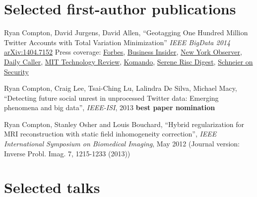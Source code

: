\documentclass[margin,line]{res}
\begin{document}
\begin{resume}
\section{\sc Selected first-author publications}

Ryan Compton, David Jurgens, David Allen, ``Geotagging One Hundred Million Twitter Accounts with Total Variation Minimization'' {\it IEEE BigData 2014} \href{https://arxiv.org/abs/1404.7152}{arXiv:1404.7152} Press coverage: \href{http://www.forbes.com/sites/thomasbrewster/2015/03/07/twitter-location-can-be-determined-through-friends/}{Forbes}, \href{http://www.businessinsider.com/twitter-location-research-at-mentions-cornell-2015-3}{Business Insider}, \href{http://observer.com/2015/03/you-dont-have-to-geotag-your-tweets-to-give-away-your-location/}{New York Observer}, \href{http://dailycaller.com/2015/03/06/how-your-tweets-can-reveal-your-real-location/}{Daily Caller}, \href{http://www.technologyreview.com/view/527246/other-interesting-arxiv-papers-week-ending-may-10-2014/}{MIT Technology Review}, \href{http://www.komando.com/happening-now/299085/forget-gps-hackers-can-pinpoint-your-exact-location-using-social-media/all}{Komando}, \href{http://ryancompton.net/assets/resume/Serene_Risc_Digest_2015_Spring.pdf}{Serene Risc Digest}, \href{http://www.schneier.com/blog/archives/2015/03/geotagging_twit.html}{Schneier on Security}

Ryan Compton, Craig Lee, Tsai-Ching Lu, Lalindra De Silva, Michael Macy, ``Detecting future social unrest in unprocessed Twitter data: Emerging phenomena and big data'', {\it IEEE-ISI}, 2013 {\bf best paper nomination}

Ryan Compton, Stanley Osher and Louis Bouchard, ``Hybrid regularization for MRI reconstruction with static field inhomogeneity correction'', {\it IEEE International Symposium on Biomedical Imaging}, May 2012 (Journal version: Inverse Probl. Imag. 7, 1215-1233 (2013))

\section{\sc Selected talks}


\end{resume}
\end{document}
